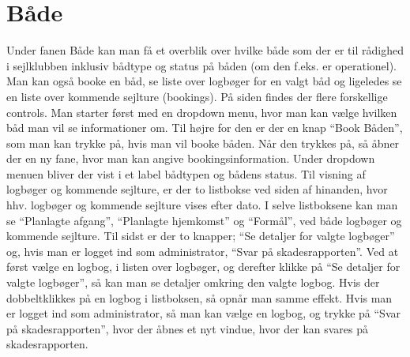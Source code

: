 \section{Både}
Under fanen Både kan man få et overblik over hvilke både som der er til rådighed i sejlklubben inklusiv bådtype og status på båden (om den f.eks. er operationel). 
Man kan også booke en båd, se liste over logbøger for en valgt båd og ligeledes se en liste over kommende sejlture (bookings). 
På siden findes der flere forskellige controls.
Man starter først med en dropdown menu, hvor man kan vælge hvilken båd man vil se informationer om.
Til højre for den er der en knap ``Book Båden'', som man kan trykke på, hvis man vil booke båden. Når den trykkes på, så åbner der en ny fane, hvor man kan angive bookingsinformation. 
Under dropdown menuen bliver der vist i et label bådtypen og bådens status. 
Til visning af logbøger og kommende sejlture, er der to listbokse ved siden af hinanden, hvor hhv. logbøger og kommende sejlture vises efter dato. 
I selve listboksene kan man se ``Planlagte afgang'', ``Planlagte hjemkomst'' og ``Formål'', ved både logbøger og kommende sejlture. 
Til sidst er der to knapper; ``Se detaljer for valgte logbøger'' og, hvis man er logget ind som administrator, ``Svar på skadesrapporten''. Ved at først vælge en logbog, i listen over logbøger, og derefter klikke på ``Se detaljer for valgte logbøger'', så kan man se detaljer omkring den valgte logbog. 
Hvis der dobbeltklikkes på en logbog i listboksen, så opnår man samme effekt. 
Hvis man er logget ind som administrator, så man kan vælge en logbog, og trykke på ``Svar på skadesrapporten'', hvor der åbnes et nyt vindue, hvor der kan svares på skadesrapporten. 



